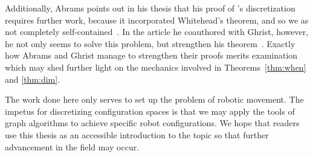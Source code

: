 Additionally, Abrams points out in his thesis that his proof of \C 's discretization requires further work, because it incorporated Whitehead's theorem, and so we as not completely self-contained~\cite{thesis}. In the article he coauthored with Ghrist, however, he not only seems to solve this problem, but strengthen his theorem~\cite{factory}. Exactly how Abrams and Ghrist manage to strengthen their proofs merits examination which may shed further light on the mechanics involved in Theorems~\ref{thm:when} and \ref{thm:dim}.

The work done here only serves to set up the problem of robotic movement. The impetus for discretizing configuration spaces is that we may apply the tools of graph algorithms to achieve specific robot configurations. We hope that readers use this thesis as an accessible introduction to the topic so that further advancement in the field may occur.

